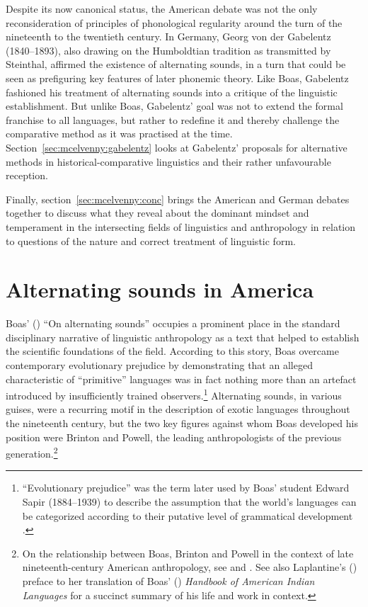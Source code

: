 \documentclass[output=paper]{langscibook}
\begin{document}
Despite its now canonical status, the American debate was not the only reconsideration of principles of phonological regularity around the turn of the nineteenth to the twentieth century. In Germany, Georg von der Gabelentz (1840--1893), also drawing on the Humboldtian tradition as transmitted by Steinthal, affirmed the existence of alternating sounds, in a turn that could be seen as prefiguring key features of later phonemic theory. Like Boas, Gabelentz fashioned his treatment of alternating sounds into a critique of the linguistic establishment. But unlike Boas, Gabelentz' goal was not to extend the formal franchise to all languages, but rather to redefine it and thereby challenge the comparative method as it was practised at the time. Section~\ref{sec:mcelvenny:gabelentz} looks at Gabelentz' proposals for alternative methods in historical-comparative linguistics and their rather unfavourable reception. 

Finally, section~\ref{sec:mcelvenny:conc} brings the American and German debates together to discuss what they reveal about the dominant mindset and temperament in the intersecting fields of linguistics and anthropology in relation to questions of the nature and correct treatment of linguistic form.

\section{Alternating sounds in America}
\label{sec:mcelvenny:america}

Boas' (\citeyear{Boas1889}) ``On alternating sounds'' occupies a prominent place in the standard disciplinary narrative of linguistic anthropology as a text that helped to establish the scientific foundations of the field. According to this story, Boas overcame contemporary evolutionary prejudice by demonstrating that an alleged characteristic of ``primitive'' languages was in fact nothing more than an artefact introduced by insufficiently trained observers.\footnote{``Evolutionary prejudice'' was the term later used by Boas' student Edward Sapir (1884--1939) to describe the assumption that the world's languages can be categorized according to their putative level of grammatical development \citep[see][130--132]{Sapir1921}.} Alternating sounds, in various guises, were a recurring motif in the description of exotic languages throughout the nineteenth century, but the two key figures against whom Boas developed his position were Brinton and Powell, the leading anthropologists of the previous generation.\footnote{On the relationship between Boas, Brinton and Powell in the context of late nineteenth-century American anthropology, see \citet{Darnell1988} and \citet{Darnell1998}. See also Laplantine's (\citeyear{Laplantine2018}) preface to her translation of Boas' (\citeyear{Boas1911}) \emph{Handbook of American Indian Languages} for a succinct summary of his life and work in context.}
\end{document}
